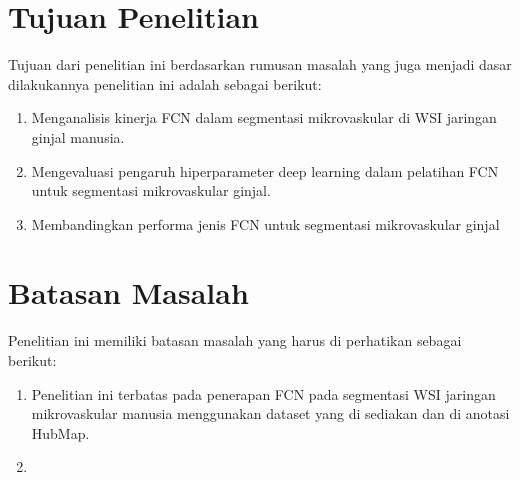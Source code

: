 \section{Tujuan Penelitian}

\noindent Tujuan dari penelitian ini berdasarkan rumusan masalah yang juga menjadi dasar dilakukannya penelitian ini adalah sebagai berikut:
\begin{enumerate}
    \item Menganalisis kinerja FCN dalam segmentasi mikrovaskular di WSI jaringan ginjal manusia.
    \item Mengevaluasi pengaruh hiperparameter deep learning dalam pelatihan FCN untuk segmentasi mikrovaskular ginjal.
    \item Membandingkan performa jenis FCN untuk segmentasi mikrovaskular ginjal
\end{enumerate}

\section{Batasan Masalah}
\noindent Penelitian ini memiliki batasan masalah yang harus di perhatikan sebagai berikut:
\begin{enumerate}
	\item Penelitian ini terbatas pada penerapan FCN pada segmentasi WSI jaringan mikrovaskular manusia menggunakan dataset yang di sediakan dan di anotasi HubMap.
	\item 
\end{enumerate}

